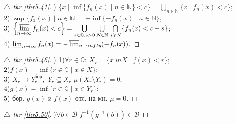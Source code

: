 
\begin{minipage}[t]{0.53\textwidth}
\begin{proof}[
{$\triangle$} 
thr \eqref{thr5.41}]

\phantom{42}

) $ \{ x \mid \inf\{f_n(x) \mid n \in \mathbb{N} \} < c\} = \bigcup_{n \in \mathbb{N}} \{x \mid f_n(x) < c \}$; \\
2) $ \sup \{ f_n(x) \mid n \in \mathbb{N} \ = - \inf \{ - f_n(x) \mid n \in \mathbb{N} \}$;\\
3) $\left\{\varlimsup\limits_{n \to \infty} f_n(x) < c \right\} = \bigcup\limits_{s \in \mathbb{Q}, s>0} \bigcup\limits_{N\in \mathbb{N}} \bigcap\limits_{n \geq N} \{ f_n(x) < c-s \}$;\\
4) $ \varliminf_{n \to \infty} f_n(x) = -\varlimsup_{n \to infty} (-f_n(x)) $.
\end{proof}



\begin{proof}[
{$\triangle$} 
thr \eqref{thr5.46}]

\phantom{42}

) 1)$\forall r \in \mathbb{Q}: \, X_r = \{ x\ in X \mid f(x) < r \}$;\\
2)$f(x) = \inf \{r \in \mathbb{Q} \mid x \in X \} $;\\
3) $X_r \to Y_r^\text{бор},$ $Y_r \subseteq X_r$ $\mu(X_r \setminus Y_r) = 0$;\\
4)$g(x) = \inf\{r \in \mathbb{Q} \mid x \in Y_r\};$\\
5) бор. $g(x)$ и $f(x)$ отл. на мн. $\mu =0$.
\end{proof}

\begin{proof}[
{$\triangle$} 
thr \eqref{thr5.50}]

\phantom{42}

)$\forall b \in \mathcal{B}$ $f^{-1} (g^{-1} (b)) \in \mathcal B$
\end{proof}
\end{minipage}
\hfill
